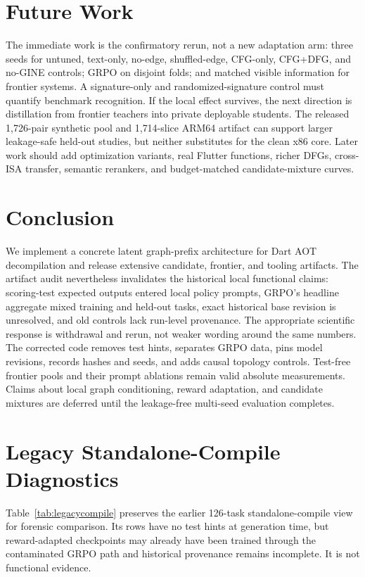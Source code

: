 \documentclass[11pt]{article}
\begin{document}
\section{Future Work}

The immediate work is the confirmatory rerun, not a new adaptation arm: three seeds for untuned, text-only, no-edge, shuffled-edge, CFG-only, CFG+DFG, and no-GINE controls; GRPO on disjoint folds; and matched visible information for frontier systems. A signature-only and randomized-signature control must quantify benchmark recognition. If the local effect survives, the next direction is distillation from frontier teachers into private deployable students. The released 1{,}726-pair synthetic pool and 1{,}714-slice ARM64 artifact can support larger leakage-safe held-out studies, but neither substitutes for the clean x86 core. Later work should add optimization variants, real Flutter functions, richer DFGs, cross-ISA transfer, semantic rerankers, and budget-matched candidate-mixture curves.

\section{Conclusion}

We implement a concrete latent graph-prefix architecture for Dart AOT decompilation and release extensive candidate, frontier, and tooling artifacts. The artifact audit nevertheless invalidates the historical local functional claims: scoring-test expected outputs entered local policy prompts, GRPO's headline aggregate mixed training and held-out tasks, exact historical base revision is unresolved, and old controls lack run-level provenance. The appropriate scientific response is withdrawal and rerun, not weaker wording around the same numbers. The corrected code removes test hints, separates GRPO data, pins model revisions, records hashes and seeds, and adds causal topology controls. Test-free frontier pools and their prompt ablations remain valid absolute measurements. Claims about local graph conditioning, reward adaptation, and candidate mixtures are deferred until the leakage-free multi-seed evaluation completes.

\appendix

\section{Legacy Standalone-Compile Diagnostics}
\label{app:legacycompile}

Table~\ref{tab:legacycompile} preserves the earlier 126-task standalone-compile view for forensic comparison. Its rows have no test hints at generation time, but reward-adapted checkpoints may already have been trained through the contaminated GRPO path and historical provenance remains incomplete. It is not functional evidence.
\end{document}
